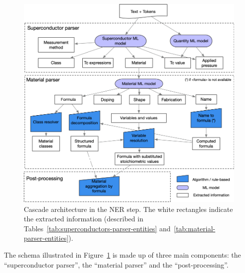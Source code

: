 \begin{figure}[htbp]
    \includegraphics[width=\textwidth]{figures/automatic_extraction_supercon/schema-extraction-colors}
    \caption{\label{fig:extraction-ml-models-cascade-architecture} Cascade architecture in the NER step. The white rectangles indicate the extracted information (described in Tables~\ref{tab:superconductors-parser-entities} and~\ref{tab:material-parser-entities}).}
\end{figure}

The schema illustrated in Figure~\ref{fig:extraction-ml-models-cascade-architecture} is made up of three main components: the ``superconductor parser'', the ``material parser'' and the ``post-processing''. 

